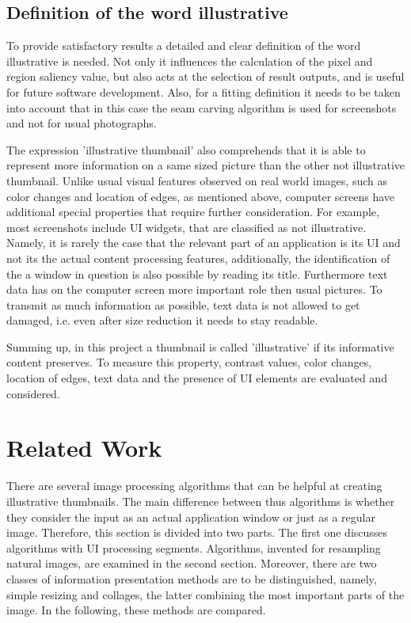\documentclass[draft,final]{vutinfth} %
\begin{document}
	\section{Definition of the word illustrative} 
	To provide satisfactory results a detailed and clear definition of the word illustrative is needed.
	Not only it influences the calculation of the pixel and region saliency value, but also acts at the selection of result outputs, and is useful for future software development.
	Also, for a fitting definition it needs to be taken into account that in this case the seam carving algorithm is used for screenshots and not for usual photographs.\par 
	The expression 'illustrative thumbnail' also comprehends that it is able to represent more information on a same sized picture than the other not illustrative thumbnail.
	Unlike usual visual features observed on real world images, such as color changes and location of edges, as mentioned above, computer screens have additional special properties that require further consideration.
	For example, most screenshots include UI widgets, that are classified as not illustrative.
	Namely, it is rarely the case that the relevant part of an application is its UI and not its the actual content processing features, additionally, the identification of the a window in question is also possible by reading its title.
	Furthermore text data has on the computer screen more important role then usual pictures.
	To transmit as much information as possible, text data is not allowed to get damaged, i.e. even after size reduction it needs to stay readable.\par 
	Summing up, in this project a thumbnail is called 'illustrative' if its informative content preserves.
	To measure this property, contrast values, color changes, location of edges, text data and the presence of UI elements are evaluated and considered.            
	
	\chapter{Related Work}
	There are several image processing algorithms that can be helpful at creating illustrative thumbnails.
	The main difference between thus algorithms is whether they consider the input as an actual application window or just as a regular image.
	Therefore, this section is divided into two parts.
	The first one discusses algorithms with UI processing segments.
	Algorithms, invented for resampling natural images, are examined in the second section. 
	Moreover, there are two classes of information presentation methods are to be distinguished, namely, simple resizing and collages, the latter combining the most important parts of the image. 
	In the following, these methods are compared.
	
\end{document}
